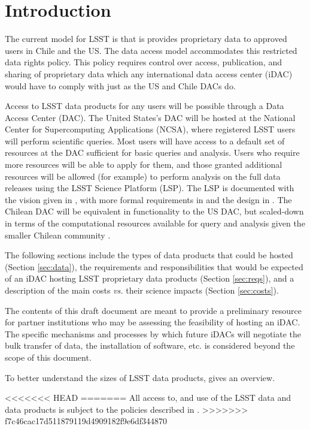 \section{Introduction}\label{sec:intro}

The current model for LSST is that is provides proprietary data to approved users in Chile and the US. The data access model accommodates this restricted data rights policy. This policy requires control over access, publication, and sharing of proprietary data which any international data access center (iDAC) would have to comply with just as the US and Chile DACs do.

Access to LSST data products for any users will be possible through a Data Access Center (DAC). The United States's DAC will be hosted at the National Center for Supercomputing Applications (NCSA),
where registered LSST users will perform scientific queries. Most users will have access to a default set of resources at the DAC sufficient for basic queries and analysis. Users who require more resources will be able to apply for them, and those granted additional resources will be allowed (for example) to perform analysis on the full data releases using the LSST Science Platform (LSP). The LSP is documented with the vision given in , with more formal requirements in  and the design in . The Chilean DAC will be equivalent in functionality to the US DAC, but scaled-down in terms of the computational resources available for query and analysis given the smaller Chilean community .

The following sections include the types of data products that could be hosted (Section \ref{sec:data}), the requirements and responsibilities that would be expected of an iDAC hosting LSST proprietary data products (Section \ref{sec:reqs}), and a description of the main costs {\it vs.} their science impacts (Section \ref{sec:costs}).

The contents of this draft document are meant to provide a preliminary resource for partner institutions who may be assessing the feasibility of hosting an iDAC. The specific mechanisms and processes by which future iDACs will negotiate the bulk transfer of data, the installation of software, etc. is considered beyond the scope of this document.

To better understand the sizes of LSST data products,  gives an overview.



<<<<<<< HEAD
=======
All access to, and use of the LSST data and data products is subject to the policies described in .
>>>>>>> f7c46cac17d511879119d4909182f9e6df344870
